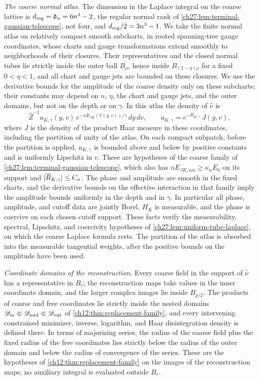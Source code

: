 \emph{The coarse normal atlas.} The dimension in the Laplace integral on the coarse lattice is $d_{\rm reg}=\mathfrak d_n=6n^3-2$, the regular normal rank of \cref{ch27:lem:terminal-gaussian-telescope}, not four, and $d_{\rm reg}/2=3n^3-1$. We take the finite normal atlas on relatively compact smooth subcharts, in rooted spanning-tree gauge coordinates, whose charts and gauge transformations extend smoothly to neighborhoods of their closures. Their representatives and the closed normal tubes lie strictly inside the outer ball $B_\rho$, hence inside $B_{(1-\eta)\rho}$ for a fixed $0<\eta<1$, and all chart and gauge jets are bounded on these closures. We use the derivative bounds for the amplitude of the coarse density only on these subcharts; their constants may depend on $n$, $\eta$, the chart and gauge jets, and the outer domains, but not on the depth or on $\gamma$. In this atlas the density of $\widehat\nu$ is
\[
 \widehat Z^{-1}a_{K,\gamma}(y,v)\,e^{-nE_{JK}(V(y,v))/\gamma}\,dy\,dv,\qquad a_{K,\gamma}=e^{-\overline R_{K,\gamma}}\,J(y,v),
\]
where $J$ is the density of the product Haar measure in these coordinates, including the partition of unity of the atlas. On each compact subpatch, before the partition is applied, $a_{K,\gamma}$ is bounded above and below by positive constants and is uniformly Lipschitz in $v$. These are hypotheses of the coarse family of \cref{ch27:lem:terminal-gaussian-telescope}, which also has $nE_{JK,\mathrm{sat}}\ge\kappa_nE_0$ on its support and $\lvert \overline R_{K,\gamma}\rvert\le C_n$. The phase and amplitude are smooth in the fixed charts, and the derivative bounds on the effective interaction in that family imply the amplitude bounds uniformly in the depth and in $\gamma$. In particular all phase, amplitude, and cutoff data are jointly Borel, $H_K$ is measurable, and the phase is coercive on each chosen cutoff support. These facts verify the measurability, spectral, Lipschitz, and coercivity hypotheses of \cref{ch27:lem:uniform-tube-laplace}, on which the coarse Laplace formula rests. The partition of the atlas is absorbed into the measurable tangential weights, after the positive bounds on the amplitude have been used.

\emph{Coordinate domains of the reconstruction.} Every coarse field in the support of $\widehat\nu$ has a representative in $B_r$; the reconstruction maps take values in the inner coordinate domain, and the larger complex images lie inside $B_{\rho/2}$. The products of coarse and free coordinates lie strictly inside the nested domains $\mathscr D_{\rm in}\Subset\mathscr D_{\rm mid}\Subset\mathscr D_{\rm out}$ of \cref{ch12:thm:replacement-family}, and every intervening constrained minimizer, inverse, logarithm, and Haar disintegration density is defined there. In terms of majorizing series, the radius of the coarse field plus the fixed radius of the free coordinates lies strictly below the radius of the outer domain and below the radius of convergence of the series. These are the hypotheses of \cref{ch12:thm:replacement-family} on the images of the reconstruction maps; no auxiliary integral is evaluated outside $B_r$.

